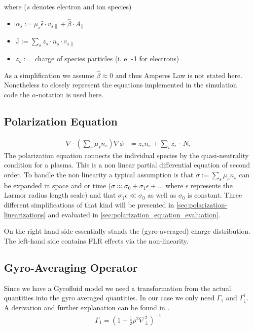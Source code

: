 \documentclass[master.tex]{subfiles}
\begin{document}
where ($s$ denotes electron and ion species)

\begin{itemize}
    \item $\alpha_s := \mu_s \hat{\epsilon} \cdot v_{s\parallel} + \hat{\beta} \cdot A_{\parallel}$
    \item $\mathrm{J} := \sum_s z_s \cdot n_s \cdot v_{s\parallel}$
    \item $z_s :=$ charge of species particles (i. e. -1 for electrons)
\end{itemize}

As a simplification we assume $\hat{\beta} \approx 0$ and thus Amperes Law is not stated here. Nonetheless to closely represent the equations implemented in the simulation code the $\alpha$-notation is used here.

\subsection{Polarization Equation}

\begin{align}
    \nabla \cdot \left( \sum_s \mu_s n_s \right) \nabla \phi &= z_e n_e + \sum_i z_i \, \cdot \, N_i \label{eq:polarization}
\end{align}
The polarization equation connects the individual species by the quasi-neutrality condition for a plasma. This is a non linear partial differential equation of second order. To handle the non linearity a typical assumption is that $\sigma := \sum_s \mu_s n_s$ can be expanded in space and or time ($\sigma \approx \sigma_0 + \sigma_1 \epsilon + ...$ where $\epsilon$ represents the Larmor radius length scale) and that $\sigma_1 \epsilon \ll \sigma_0$ as well as $\sigma_0$ is constant. Three different simplifications of that kind will be presented in \autoref{sec:polarization-linearizations} and evaluated in \autoref{sec:polarization_equation_evaluation}. 


\begin{blockquote}
    On the right hand side essentially stands the (gyro-averaged) charge distribution. The left-hand side contains \ac{FLR} effects via the non-linearity.
\end{blockquote}

\subsection{Gyro-Averaging Operator}
Since we have a Gyrofluid model we need a transformation from the actual quantities into the gyro averaged quantities. In our case we only need $\Gamma_1$ and $\Gamma_1^\dagger$. A derivation and further explanation can be found in \cite{HeldDisseration}.
\begin{align}
    \label{eq:gyro-averaging-opeartor}
    \Gamma_1 = \left(1- \frac{1}{2} \rho^2 \nabla_\perp^2\right)^{-1}
\end{align}
\end{document}

